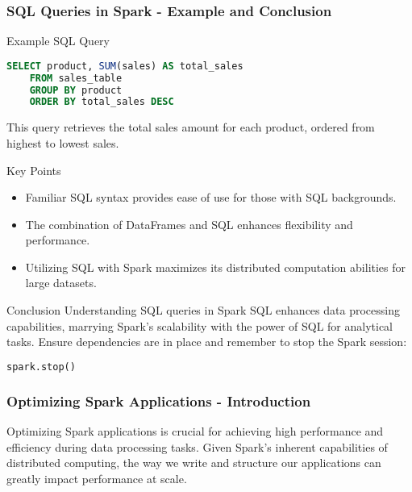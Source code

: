 \documentclass[aspectratio=169]{beamer}
\begin{document}
\begin{frame}[fragile]
  \frametitle{SQL Queries in Spark - Example and Conclusion}
  \begin{block}{Example SQL Query}
    \begin{lstlisting}[language=SQL]
    SELECT product, SUM(sales) AS total_sales 
    FROM sales_table 
    GROUP BY product 
    ORDER BY total_sales DESC
    \end{lstlisting}
    This query retrieves the total sales amount for each product, ordered from highest to lowest sales.
  \end{block}

  \begin{block}{Key Points}
    \begin{itemize}
      \item Familiar SQL syntax provides ease of use for those with SQL backgrounds.
      \item The combination of DataFrames and SQL enhances flexibility and performance.
      \item Utilizing SQL with Spark maximizes its distributed computation abilities for large datasets.
    \end{itemize}
  \end{block}

  \begin{block}{Conclusion}
    Understanding SQL queries in Spark SQL enhances data processing capabilities, marrying Spark's scalability with the power of SQL for analytical tasks.
    Ensure dependencies are in place and remember to stop the Spark session:
    \begin{lstlisting}[language=Python]
    spark.stop()
    \end{lstlisting}
  \end{block}
\end{frame}

\begin{frame}[fragile]
  \frametitle{Optimizing Spark Applications - Introduction}
  Optimizing Spark applications is crucial for achieving high performance and efficiency during data processing tasks. Given Spark's inherent capabilities of distributed computing, the way we write and structure our applications can greatly impact performance at scale.
\end{frame}
\end{document}
